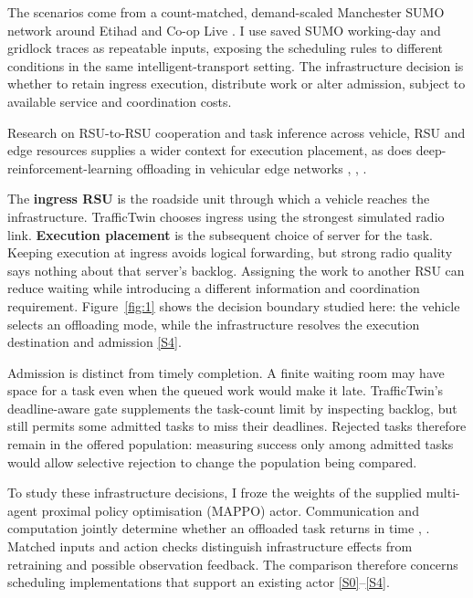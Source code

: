 \documentclass[12pt,a4paper]{article}
\begin{document}
The scenarios come from a count-matched, demand-scaled Manchester SUMO network around Etihad and Co-op Live \cite{ref47}. I use saved SUMO working-day and gridlock traces as repeatable inputs, exposing the scheduling rules to different conditions in the same intelligent-transport setting. The infrastructure decision is whether to retain ingress execution, distribute work or alter admission, subject to available service and coordination costs.

Research on RSU-to-RSU cooperation \cite{ref7} and task inference across vehicle, RSU and edge resources \cite{ref8} supplies a wider context for execution placement, as does deep-reinforcement-learning offloading in vehicular edge networks \cite{ref9}, \cite{ref10}, \cite{ref11}.

The \textbf{ingress RSU} is the roadside unit through which a vehicle reaches the infrastructure. TrafficTwin chooses ingress using the strongest simulated radio link. \textbf{Execution placement} is the subsequent choice of server for the task. Keeping execution at ingress avoids logical forwarding, but strong radio quality says nothing about that server's backlog. Assigning the work to another RSU can reduce waiting while introducing a different information and coordination requirement. Figure~\ref{fig:1} shows the decision boundary studied here: the vehicle selects an offloading mode, while the infrastructure resolves the execution destination and admission \hyperref[source-s4]{[S4]}.

Admission is distinct from timely completion. A finite waiting room may have space for a task even when the queued work would make it late. TrafficTwin's deadline-aware gate supplements the task-count limit by inspecting backlog, but still permits some admitted tasks to miss their deadlines. Rejected tasks therefore remain in the offered population: measuring success only among admitted tasks would allow selective rejection to change the population being compared.

To study these infrastructure decisions, I froze the weights of the supplied multi-agent proximal policy optimisation (MAPPO) actor. Communication and computation jointly determine whether an offloaded task returns in time \cite{ref3}, \cite{ref6}. Matched inputs and action checks distinguish infrastructure effects from retraining and possible observation feedback. The comparison therefore concerns scheduling implementations that support an existing actor \hyperref[source-s0]{[S0]}--\hyperref[source-s4]{[S4]}.
\end{document}
